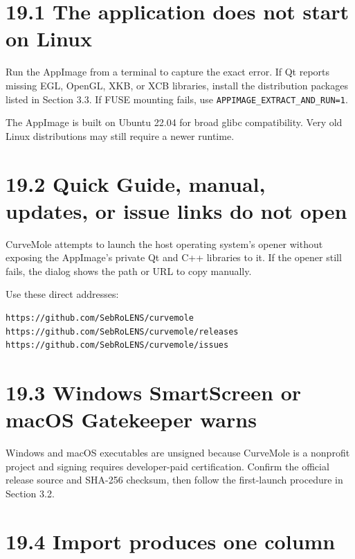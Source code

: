 \documentclass[
  10pt,
  a4paper,
  oneside]{scrreprt}
\begin{document}
\hypertarget{the-application-does-not-start-on-linux}{%
\section{19.1 The application does not start on
Linux}\label{the-application-does-not-start-on-linux}}

Run the AppImage from a terminal to capture the exact error. If Qt
reports missing EGL, OpenGL, XKB, or XCB libraries, install the
distribution packages listed in Section 3.3. If FUSE mounting fails, use
\texttt{APPIMAGE\_EXTRACT\_AND\_RUN=1}.

The AppImage is built on Ubuntu 22.04 for broad glibc compatibility.
Very old Linux distributions may still require a newer runtime.

\hypertarget{quick-guide-manual-updates-or-issue-links-do-not-open}{%
\section{19.2 Quick Guide, manual, updates, or issue links do not
open}\label{quick-guide-manual-updates-or-issue-links-do-not-open}}

CurveMole attempts to launch the host operating system's opener without
exposing the AppImage's private Qt and C++ libraries to it. If the
opener still fails, the dialog shows the path or URL to copy manually.

Use these direct addresses:

\begin{verbatim}
https://github.com/SebRoLENS/curvemole
https://github.com/SebRoLENS/curvemole/releases
https://github.com/SebRoLENS/curvemole/issues
\end{verbatim}

\hypertarget{windows-smartscreen-or-macos-gatekeeper-warns}{%
\section{19.3 Windows SmartScreen or macOS Gatekeeper
warns}\label{windows-smartscreen-or-macos-gatekeeper-warns}}

Windows and macOS executables are unsigned because CurveMole is a
nonprofit project and signing requires developer-paid certification.
Confirm the official release source and SHA-256 checksum, then follow
the first-launch procedure in Section 3.2.

\hypertarget{import-produces-one-column}{%
\section{19.4 Import produces one
column}\label{import-produces-one-column}}
\end{document}
